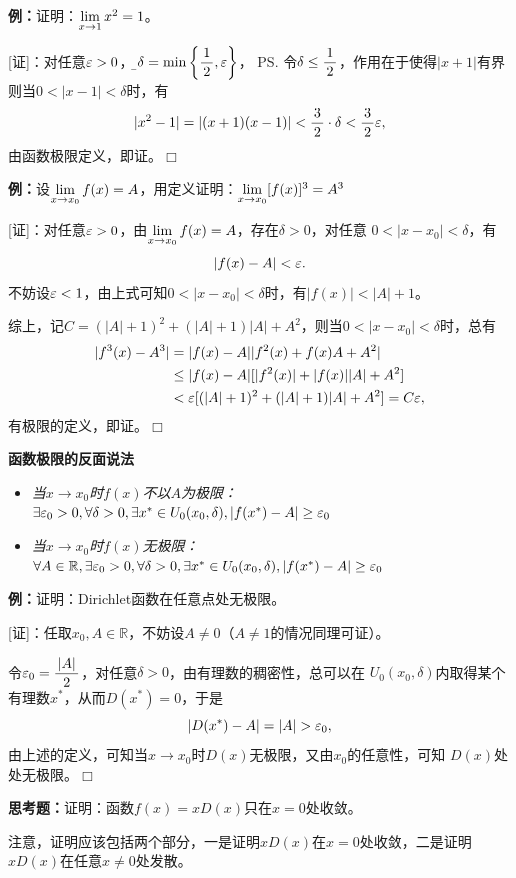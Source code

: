 {\bf 例：}证明：$\lim\limits_{x\to{1}}x^2=1$。

[证]：对任意$\varepsilon>0$，令{\b$\delta=\min\left\{\displaystyle\frac{\,{1}\,}{\,{2}\,},\varepsilon\right\}$}，
\ps{令$\delta\leq\displaystyle\frac{\,{1}\,}{\,{2}\,}$，作用在于使得$|x+1|$有界}
则当$0<|x-1|<\delta$时，有
$$|x^2-1|=|(x+1)(x-1)|<\displaystyle\frac{\,{3}\,}{\,{2}\,}\cdot\delta<\displaystyle\frac{\,{3}\,}{\,{2}\,}\varepsilon,$$
由函数极限定义，即证。\hfill $\Box$

{\bf 例：}设$\lim\limits_{x\to{x_0}}f(x)=A$，用定义证明：$\lim\limits_{x\to{x_0}}[f(x)]^3=A^3$

[证]：对任意$\varepsilon>0$，由$\lim\limits_{x\to{x_0}}f(x)=A$，存在$\delta>0$，对任意
$0<|x-x_0|<\delta$，有
$$|f(x)-A|<\varepsilon.$$
不妨设$\varepsilon<1$，由上式可知$0<|x-x_0|<\delta$时，有$|f(x)|<|A|+1$。

综上，记$C=(|A|+1)^2+(|A|+1)|A|+A^2$，则当$0<|x-x_0|<\delta$时，总有
\begin{align}
	|f^3(x)-A^3|&=|f(x)-A||f^2(x)+f(x)A+A^2|\notag\\
	&\leq |f(x)-A|[|f^2(x)|+|f(x)||A|+A^2]\notag\\
	&<\varepsilon[(|A|+1)^2+(|A|+1)|A|+A^2]=C\varepsilon\notag,
\end{align}
有极限的定义，即证。\hfill $\Box$

\begin{shaded}
	\begin{tcolorbox}
		{\bf 函数极限的反面说法}
		\begin{itemize}
		  \item {\it 当$x\to x_0$时$f(x)$不以$A$为极限：} 
		    $\exists\varepsilon_0>0,\forall\delta>0, \exists x^*\in
		    U_0(x_0,\delta),|f(x^*)-A|\geq\varepsilon_0$ 
		  \item {\it 当$x\to x_0$时$f(x)$无极限：}
			$\forall A\in\mathbb{R},\exists\varepsilon_0>0,\forall\delta>0, \exists x^*\in
		    U_0(x_0,\delta),|f(x^*)-A|\geq\varepsilon_0$ 
		\end{itemize}
	\end{tcolorbox}

	{\bf 例：}证明：Dirichlet函数在任意点处无极限。
	
	[证]：任取$x_0,A\in\mathbb{R}$，不妨设$A\ne 0$（$A\ne 1$的情况同理可证）。
	
	令$\varepsilon_0=\displaystyle\frac{\,{|A|}\,}{\,{2}\,}$，对任意$\delta>0$，由有理数的稠密性，总可以在
	$U_0(x_0,\delta)$内取得某个有理数$x^*$，从而$D(x^*)=0$，于是
	$$|D(x^*)-A|=|A|>\e_0,$$
	由上述的定义，可知当$x\to x_0$时$D(x)$无极限，又由$x_0$的任意性，可知
	$D(x)$处处无极限。\hfill $\Box$
	
	{\bf 思考题：}证明：函数$f(x)=xD(x)$只在$x=0$处收敛。

	注意，证明应该包括两个部分，一是证明$xD(x)$在$x=0$处收敛，二是证明
	$xD(x)$在任意$x\ne 0$处发散。
\end{shaded}

